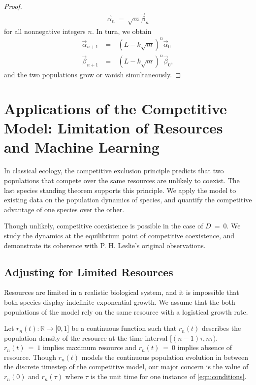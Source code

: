\documentclass[11pt,reqno]{amsart}
\numberwithin{equation}{section}
\theoremstyle{plain}
\begin{document}
\begin{proof}
    \begin{eqnarray}
        \vec \alpha_n \ = \ \sqrt m \vec \beta_n
    \end{eqnarray}
    for all nonnegative integers $n$. In turn, we obtain 
    \begin{eqnarray}
        \vec \alpha_{n + 1} \ &=& \ 
        \left(
            L - k \sqrt m
        \right)^n \vec \alpha_0 \nonumber
        \\ 
        \vec \beta_{n + 1} \ &=& \ 
        \left(
            L - k \sqrt m
        \right)^n \vec \beta_0,
    \end{eqnarray}
    and the two populations grow or vanish simultaneously. 
\end{proof}

\section{Applications of the Competitive Model: Limitation of Resources and Machine Learning}

In classical ecology, the competitive exclusion principle predicts that two 
populations that compete over the same resources are unlikely to coexist. The 
last species standing theorem supports this principle. We apply the model to 
existing data on the population dynamics of species, and 
quantify the competitive advantage of one species over the other. 

Though unlikely, competitive coexistence is possible in the case of $D \ = \  0$. 
We study the dynamics at the equilibrium point of competitive coexistence, and demonstrate its coherence with P. H. Leslie's original observations. 

\subsection{Adjusting for Limited Resources}
Resources are limited in a realistic biological system, and it is 
impossible that both species display indefinite exponential growth. We assume that the both populations of the model rely on the same resource with a logistical growth rate. 

Let $r_n(t):\mathbb R \rightarrow \mathbb [0, 1]$ be a continuous function such that $r_n(t)$ 
describes the population density of the resource at the time interval $[(n - 1)\tau, n\tau)$. $r_n(t) \ = \  1$ implies maximum resource and $r_n(t) \ = \  0$ implies absence of resource. Though $r_n(t)$ models the continuous population evolution in between the discrete timestep of the competitive model, our major concern is the value of $r_n(0)$ and $r_n(\tau)$ where $\tau$ is the unit time for one instance of \eqref{eqn:conditions}. 
\end{document}
